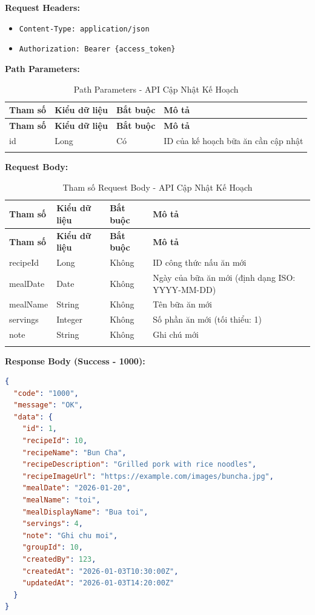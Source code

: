 \textbf{Request Headers:}
\begin{itemize}
    \item \texttt{Content-Type: application/json}
    \item \texttt{Authorization: Bearer \{access\_token\}}
\end{itemize}

\textbf{Path Parameters:}

\small
\begin{longtable}{|>{\raggedright\arraybackslash}p{3cm}|>{\raggedright\arraybackslash}p{2.5cm}|>{\raggedright\arraybackslash}p{2cm}|>{\raggedright\arraybackslash}p{6cm}|}
\hline
\textbf{Tham số} & \textbf{Kiểu dữ liệu} & \textbf{Bắt buộc} & \textbf{Mô tả} \\
\hline
\endfirsthead
\hline
\textbf{Tham số} & \textbf{Kiểu dữ liệu} & \textbf{Bắt buộc} & \textbf{Mô tả} \\
\hline
\endhead
id & Long & Có & ID của kế hoạch bữa ăn cần cập nhật \\
\hline
\caption{Path Parameters - API Cập Nhật Kế Hoạch}
\end{longtable}

\textbf{Request Body:}

\small
\begin{longtable}{|>{\raggedright\arraybackslash}p{3.5cm}|>{\raggedright\arraybackslash}p{2.5cm}|>{\raggedright\arraybackslash}p{2cm}|>{\raggedright\arraybackslash}p{5.5cm}|}
\hline
\textbf{Tham số} & \textbf{Kiểu dữ liệu} & \textbf{Bắt buộc} & \textbf{Mô tả} \\
\hline
\endfirsthead
\hline
\textbf{Tham số} & \textbf{Kiểu dữ liệu} & \textbf{Bắt buộc} & \textbf{Mô tả} \\
\hline
\endhead
recipeId & Long & Không & ID công thức nấu ăn mới \\
\hline
mealDate & Date & Không & Ngày của bữa ăn mới (định dạng ISO: YYYY-MM-DD) \\
\hline
mealName & String & Không & Tên bữa ăn mới \\
\hline
servings & Integer & Không & Số phần ăn mới (tối thiểu: 1) \\
\hline
note & String & Không & Ghi chú mới \\
\hline
\caption{Tham số Request Body - API Cập Nhật Kế Hoạch}
\end{longtable}

\textbf{Response Body (Success - 1000):}

\begin{lstlisting}[language=json, caption=Response thanh cong API 2.4]
{
  "code": "1000",
  "message": "OK",
  "data": {
    "id": 1,
    "recipeId": 10,
    "recipeName": "Bun Cha",
    "recipeDescription": "Grilled pork with rice noodles",
    "recipeImageUrl": "https://example.com/images/buncha.jpg",
    "mealDate": "2026-01-20",
    "mealName": "toi",
    "mealDisplayName": "Bua toi",
    "servings": 4,
    "note": "Ghi chu moi",
    "groupId": 10,
    "createdBy": 123,
    "createdAt": "2026-01-03T10:30:00Z",
    "updatedAt": "2026-01-03T14:20:00Z"
  }
}
\end{lstlisting}

